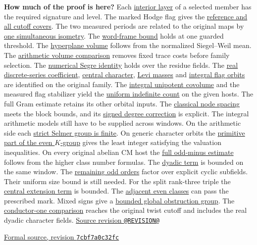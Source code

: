 \documentclass[10pt,a4paper,oneside,openany]{report}
\theoremstyle{remark}\newtheorem{remark}[theorem]{Remark}
\begin{document}
\begin{titlepage}
\textbf{How much of the proof is here?} Each \hyperref[claim:GRT103]{interior layer} of a selected member has the required signature and level. The marked Hodge flag gives the \hyperref[claim:GRT107]{reference and all cutoff covers}. The two measured periods are related to the original maps by \hyperref[claim:FBE43]{one simultaneous isometry}. The \hyperref[claim:FBE44]{word-frame bound} holds at one guarded threshold. The \hyperref[claim:FBE49]{hyperplane volume} follows from the normalized Siegel--Weil mean. The \hyperref[claim:GRT109]{arithmetic volume comparison} removes fixed trace costs before family selection. The \hyperref[claim:GRT111]{numerical Segre identity} holds over the residue fields. The \hyperref[claim:FBE61]{real discrete-series coefficient}, \hyperref[claim:FBE62]{central character}, \hyperref[claim:FBE63]{Levi masses} and \hyperref[claim:FBE64]{integral flag orbits} are identified on the original family. The \hyperref[claim:FBE67]{integral unipotent covolume} and the measured flag stabilizer yield the \hyperref[claim:FBE68]{uniform indefinite count} on the given hosts. The full Gram estimate retains its other orbital inputs. The \hyperref[claim:WNS1]{classical node spacing} meets the block bounds, and its \hyperref[claim:WNS3]{signed degree correction} is explicit. The integral arithmetic models still have to be supplied across windows. On the arithmetic side each \hyperref[claim:ETS10]{strict Selmer group is finite}. On generic character orbits the \hyperref[claim:ETS11]{primitive part of the even \(K\)-group} gives the least integer satisfying the valuation inequalities. On every original abelian CM host the \hyperref[claim:ETS18]{full odd-minus estimate} follows from the higher class number formulas. The \hyperref[claim:ETS21]{dyadic term} is bounded on the same window. The \hyperref[claim:ETS24]{remaining odd orders} factor over explicit cyclic subfields. Their uniform size bound is still needed. For the split rank-three triple the \hyperref[claim:ETS27]{central extension term} is bounded. The \hyperref[claim:ETS29]{adjacent even classes} can pass the prescribed mark. Mixed signs give a \hyperref[claim:ETS31]{bounded global obstruction group}. The \hyperref[claim:ETS34]{conductor-one comparison} reaches the original twist cutoff and includes the real dyadic character fields.
\vfill
\href{https://github.com/bmatschke/grh-alpoge-claude/tree/@REVISION@}{Source revision \texttt{@REVISION@}}\par
\href{https://github.com/CocoSgt/riemann-hypothesis-lean/tree/7cbf7a0c32fca1badf05931879a37c3f8a2b03b4}{Formal source, revision \texttt{7cbf7a0c32fc}}\par
\end{titlepage}
\begingroup
\small\setlength{\parskip}{0pt}\tableofcontents
\endgroup
\clearpage{}
\end{document}
